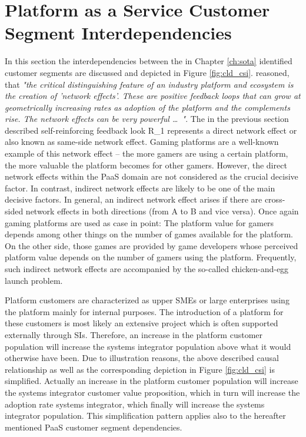 \section{Platform as a Service Customer Segment Interdependencies}\label{ch:cld:csi}

In this section the interdependencies between the in Chapter \ref{ch:sota} identified customer segments are discussed and depicted in Figure \ref{fig:cld_csi}. \citet[p. 33]{Cusumano2010} reasoned, that \textit{"the critical distinguishing feature of an industry platform and ecosystem is the creation of 'network effects'. These are positive feedback loops that can grow at geometrically increasing rates as adoption of the platform and the complements rise. The network effects can be very powerful \ldots~"}. The in the previous section described self-reinforcing feedback look R\_1 represents a direct network effect or also known as same-side network effect. Gaming platforms are a well-known example of this network effect -- the more gamers are using a certain platform, the more valuable the platform becomes for other gamers. However, the direct network effects within the \ac{PaaS} domain are not considered as the crucial decisive factor. In contrast, indirect network effects are likely to be one of the main decisive factors. In general, an indirect network effect arises if there are cross-sided network effects in both directions (from A to B and vice versa). Once again gaming platforms are used as case in point: The platform value for gamers depends among other things on the number of games available for the platform. On the other side, those games are provided by game developers whose perceived platform value depends on the number of gamers using the platform. Frequently, such indirect network effects are accompanied by the so-called chicken-and-egg launch problem. 

Platform customers are characterized as upper \acp{SME} or large enterprises using the platform mainly for internal purposes. The introduction of a platform for these customers is most likely an extensive project which is often supported externally through \acp{SI}. Therefore, an increase in the platform customer population will increase the systems integrator population above what it would otherwise have been. Due to illustration reasons, the above described causal relationship as well as the corresponding depiction in Figure \ref{fig:cld_csi} is simplified. Actually an increase in the platform customer population will increase the systems integrator customer value proposition, which in turn will increase the adoption rate systems integrator, which finally will increase the systems integrator population. This simplification pattern applies also to the hereafter mentioned \ac{PaaS} customer segment dependencies.

